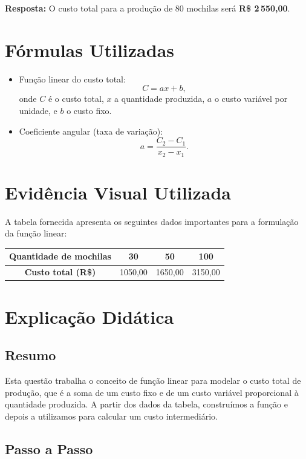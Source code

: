 \documentclass{article}
\begin{document}
\textbf{Resposta:} O custo total para a produção de 80 mochilas será \textbf{R\$ 2\,550,00}.

\section*{Fórmulas Utilizadas}

\begin{itemize}
  \item Função linear do custo total:
  \[
  C = ax + b,
  \]
  onde $C$ é o custo total, $x$ a quantidade produzida, $a$ o custo variável por unidade, e $b$ o custo fixo.

  \item Coeficiente angular (taxa de variação):
  \[
  a = \frac{C_2 - C_1}{x_2 - x_1}.
  \]
\end{itemize}

\section*{Evidência Visual Utilizada}

A tabela fornecida apresenta os seguintes dados importantes para a formulação da função linear:

\begin{center}
\begin{tabular}{|c|c|c|c|}
  \hline
  \rowcolor{pink}
  \textbf{Quantidade de mochilas} & 30 & 50 & 100 \\
  \hline
  \textbf{Custo total (R\$)} & 1050,00 & 1650,00 & 3150,00 \\
  \hline
\end{tabular}
\end{center}

\section*{Explicação Didática}

\subsection*{Resumo}

Esta questão trabalha o conceito de função linear para modelar o custo total de produção, que é a soma de um custo fixo e de um custo variável proporcional à quantidade produzida. A partir dos dados da tabela, construímos a função e depois a utilizamos para calcular um custo intermediário.

\subsection*{Passo a Passo}
\end{document}
